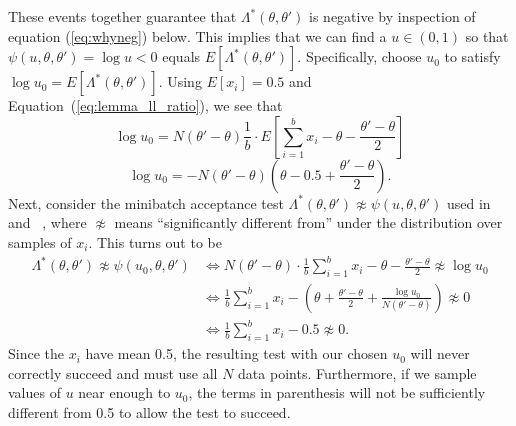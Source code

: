 \documentclass{article}
\begin{document}
These events together guarantee that $\Lambda^*(\theta,\theta')$ is negative
by inspection of equation (\ref{eq:whyneg}) below.
This implies that we can find a $u \in (0,1)$ so that
$\psi(u,\theta,\theta') = \log u < 0$ equals $E[\Lambda^*(\theta,\theta')]$.
Specifically, choose $u_0$ to satisfy $\log u_0 = E[\Lambda^*(\theta,\theta')]$.
Using $E[x_i] = 0.5$ and Equation~(\ref{eq:lemma_ll_ratio}), we see that
\begin{equation}
  \log u_0 = N(\theta'-\theta)\frac{1}{b} \cdot E\left[\sum_{i=1}^b x_i-\theta-\frac{\theta'-\theta}{2}\right]
\end{equation}
\begin{equation}\label{eq:whyneg}
    \log u_0 = -N(\theta'-\theta)\left(\theta-0.5+\frac{\theta'-\theta}{2}\right).
\end{equation}
Next, consider the minibatch acceptance test $\Lambda^*(\theta,\theta') \not\approx
\psi(u,\theta,\theta')$ used in ~\cite{cutting_mh_2014} and~\cite{icml2014c1_bardenet14} , where $\not\approx$
means ``significantly different from'' under the distribution over
samples of $x_i$. This turns out to be
\begin{align}
\Lambda^*(\theta,\theta')  \not\approx \psi(u_0,\theta,\theta') 
&\iff N(\theta'-\theta) \cdot \frac{1}{b}\sum_{i=1}^b x_i-\theta-\frac{\theta'-\theta}{2} \not\approx \log u_0\\
&\iff \frac{1}{b}\sum_{i=1}^b x_i-\left(\theta+\frac{\theta'-\theta}{2} + \frac{\log u_0}{N(\theta'-\theta)}\right) \not\approx  0 \\
&\iff \frac{1}{b}\sum_{i=1}^b x_i-0.5 \not\approx 0. \label{eq:accept_test_zero}
\end{align}
Since the $x_i$ have mean 0.5, the resulting test with our chosen $u_0$ will
never correctly succeed and must use all $N$ data points.  Furthermore, if we
sample values of $u$ near enough to $u_0$, the terms in parenthesis will not be
sufficiently different from 0.5 to allow the test to succeed. 
  
\end{document}
